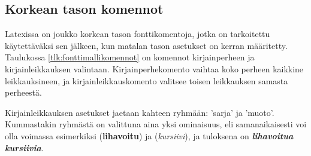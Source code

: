 \subsection{Korkean tason komennot}
\label{luku:fontit_korkea}

Latexissa on joukko korkean tason fonttikomentoja, jotka on tarkoitettu
käytettäväksi sen jälkeen, kun matalan tason asetukset on kerran
määritetty. Taulukossa \ref{tlk:fonttimallikomennot} on komennot
kirjainperheen ja kirjainleikkauksen valintaan. Kirjainperhekomento
vaihtaa koko perheen kaikkine leikkauksineen, ja kirjainleikkauskomento
valitsee toisen leikkauksen samasta perheestä.


Kirjainleikkauksen asetukset jaetaan kahteen ryhmään:
 'sarja' ja  'muoto'.
Kummastakin ryhmästä on valittuna aina yksi ominaisuus, eli
samanaikaisesti voi olla voimassa esimerkiksi 
(\textbf{lihavoitu}) ja  (\textit{kursiivi}), ja
tuloksena on \textbf{\itshape lihavoitua kursiivia}.


